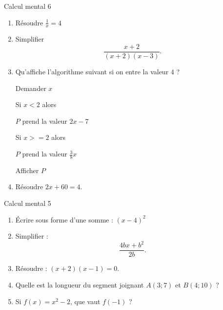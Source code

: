 \documentclass{beamer}
\newenvironment{fmpage}[1]
 {\begin{lrbox}{\fmbox}\begin{minipage}{#1}}
     {\end{minipage}\end{lrbox}
     \fbox{\usebox{\fmbox}}
 }
\begin{document}
\begin{frame}{Calcul mental 6}
    \begin{enumerate}
        \item
            \pause
            Résoudre \( \frac{1}{ x }=4\)
        \item
            \pause
            Simplifier
            \begin{equation*}
                \frac{ x+2 }{ (x+2)(x-3) }.
            \end{equation*}
        \item
            \pause
            Qu'affiche l'algorithme suivant si on entre la valeur \( 4\) ?

\begin{fmpage}{0.9\linewidth}

    Demander \( x\)

    Si \( x < 2\) alors

    \hspace{1cm} \( P\) prend la valeur \( 2x-7 \)

    Si \( x >= 2 \) alors

    \hspace{1cm} \( P\) prend la valeur \( \frac{ 3 }{ 8 }x\)

    Afficher \( P\)

\end{fmpage}
        \item
            \pause
                Résoudre \( 2x+60=4\).

    \end{enumerate}
\end{frame}

\begin{frame}{Calcul mental 5}

    \begin{enumerate}
        \item

    \pause
            Écrire sous forme d'une somme : \( (x-4)^2\)

        \item
    \pause
            Simplifier :
            \begin{equation}
                \frac{ 4bx+b^2 }{ 2b }.
            \end{equation}
        \item

    \pause
            Résoudre : \( (x+2)(x-1)=0\).

        \item
    \pause
            Quelle est la longueur du segment joignant \( A(3;7)\) et \( B(4;10)\) ?
        \item
    \pause
            Si \( f(x)=x^2-2\), que vaut \( f(-1)\) ?
            
    \end{enumerate}
\end{frame}
\end{document}
